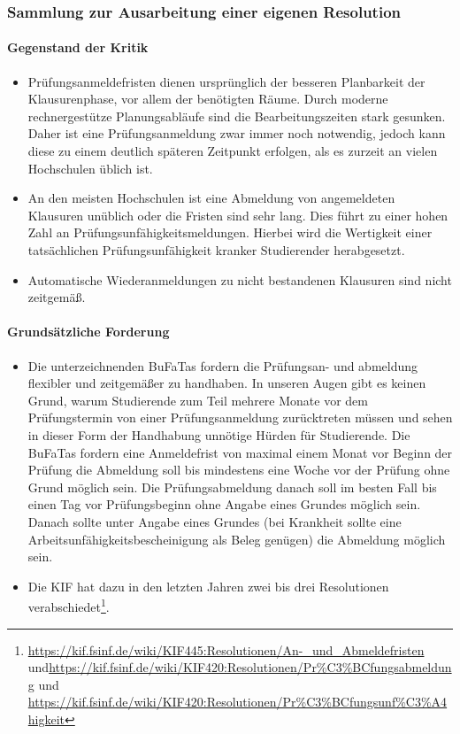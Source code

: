     \subsubsection{Sammlung zur Ausarbeitung einer eigenen Resolution}
      \paragraph{Gegenstand der Kritik}
        \begin{itemize}
          \item Prüfungsanmeldefristen dienen ursprünglich der besseren Planbarkeit der Klausurenphase, vor allem der benötigten Räume. Durch moderne rechnergestütze Planungsabläufe sind die Bearbeitungszeiten stark gesunken. Daher ist eine Prüfungsanmeldung zwar immer noch notwendig, jedoch kann diese zu einem deutlich späteren Zeitpunkt erfolgen, als es zurzeit an vielen Hochschulen üblich ist. \\
          \item An den meisten Hochschulen ist eine Abmeldung von angemeldeten Klausuren unüblich oder die Fristen sind sehr lang. Dies führt zu einer hohen Zahl an Prüfungsunfähigkeitsmeldungen. Hierbei wird die Wertigkeit einer tatsächlichen Prüfungsunfähigkeit kranker Studierender herabgesetzt. \\
          \item Automatische Wiederanmeldungen zu nicht bestandenen Klausuren sind nicht zeitgemäß.
        \end{itemize}

      \paragraph{Grundsätzliche Forderung}
        \begin{itemize}
          \item Die unterzeichnenden BuFaTas fordern die Prüfungsan- und abmeldung flexibler und zeitgemäßer zu handhaben. In unseren Augen gibt es keinen Grund, warum Studierende zum Teil mehrere Monate vor dem Prüfungstermin von einer Prüfungsanmeldung zurücktreten müssen und sehen in dieser Form der Handhabung unnötige Hürden für Studierende. Die BuFaTas fordern eine Anmeldefrist von maximal einem Monat vor Beginn der Prüfung die Abmeldung soll bis mindestens eine Woche vor der Prüfung ohne Grund möglich sein. Die Prüfungsabmeldung danach soll im besten Fall bis einen Tag vor Prüfungsbeginn ohne Angabe eines Grundes möglich sein. Danach sollte unter Angabe eines Grundes (bei Krankheit sollte eine Arbeitsunfähigkeitsbescheinigung als Beleg genügen) die Abmeldung möglich sein.
          \item Die KIF hat dazu in den letzten Jahren zwei bis drei Resolutionen verabschiedet\footnote{\url{https://kif.fsinf.de/wiki/KIF445:Resolutionen/An-_und_Abmeldefristen} und\url{https://kif.fsinf.de/wiki/KIF420:Resolutionen/Pr\%C3\%BCfungsabmeldung} und \url{https://kif.fsinf.de/wiki/KIF420:Resolutionen/Pr\%C3\%BCfungsunf\%C3\%A4higkeit}}.
        \end{itemize}

